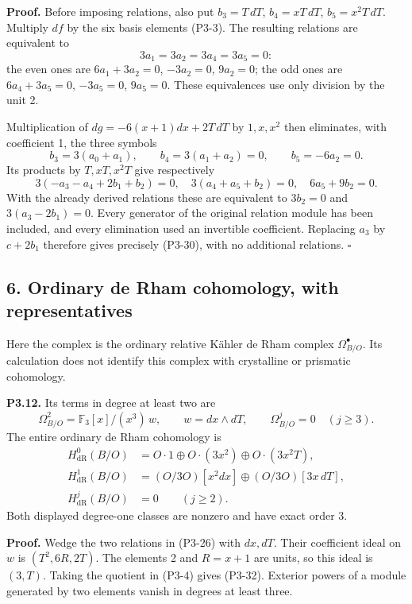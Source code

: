 \documentclass[
]{article}
\begin{document}
\textbf{Proof.} Before imposing relations, also put \(b_3=T\,dT\),
\(b_4=xT\,dT\), \(b_5=x^2T\,dT\). Multiply \(df\) by the six basis
elements (P3-3). The resulting relations are equivalent to \[
3a_1=3a_2=3a_4=3a_5=0:
\] the even ones are \(6a_1+3a_2=0\), \(-3a_2=0\), \(9a_2=0\); the odd
ones are \(6a_4+3a_5=0\), \(-3a_5=0\), \(9a_5=0\). These equivalences
use only division by the unit 2.

Multiplication of \(dg=-6(x+1)dx+2T\,dT\) by \(1,x,x^2\) then
eliminates, with coefficient 1, the three symbols \[
b_3=3(a_0+a_1),\qquad
b_4=3(a_1+a_2)=0,\qquad b_5=-6a_2=0.
\] Its products by \(T,xT,x^2T\) give respectively \[
3(-a_3-a_4+2b_1+b_2)=0,\quad
3(a_4+a_5+b_2)=0,\quad
6a_5+9b_2=0.
\] With the already derived relations these are equivalent to \(3b_2=0\)
and \(3(a_3-2b_1)=0\). Every generator of the original relation module
has been included, and every elimination used an invertible coefficient.
Replacing \(a_3\) by \(c+2b_1\) therefore gives precisely (P3-30), with
no additional relations. \(\square\)

\subsection{6. Ordinary de Rham cohomology, with
representatives}\label{ordinary-de-rham-cohomology-with-representatives}

Here the complex is the ordinary relative Kähler de Rham complex
\(\Omega^\bullet_{B/O}\). Its calculation does not identify this complex
with crystalline or prismatic cohomology.

\textbf{P3.12.} Its terms in degree at least two are \[
\Omega^2_{B/O}=\mathbb F_3[x]/(x^3)\,w,
\qquad w=dx\wedge dT,\qquad \Omega^j_{B/O}=0\quad(j\ge3).
\tag{P3-32}
\] The entire ordinary de Rham cohomology is \[
\begin{aligned}
H^0_{\mathrm{dR}}(B/O)&=O\cdot1\oplus O\cdot(3x^2)
\oplus O\cdot(3x^2T),\\
H^1_{\mathrm{dR}}(B/O)&=(O/3O)[x^2dx]
\oplus(O/3O)[3x\,dT],\\
H^j_{\mathrm{dR}}(B/O)&=0\qquad(j\ge2).
\end{aligned}
\tag{P3-33}
\] Both displayed degree-one classes are nonzero and have exact order 3.

\textbf{Proof.} Wedge the two relations in (P3-26) with \(dx,dT\). Their
coefficient ideal on \(w\) is \((T^2,6R,2T)\). The elements 2 and
\(R=x+1\) are units, so this ideal is \((3,T)\). Taking the quotient in
(P3-4) gives (P3-32). Exterior powers of a module generated by two
elements vanish in degrees at least three.
\end{document}
